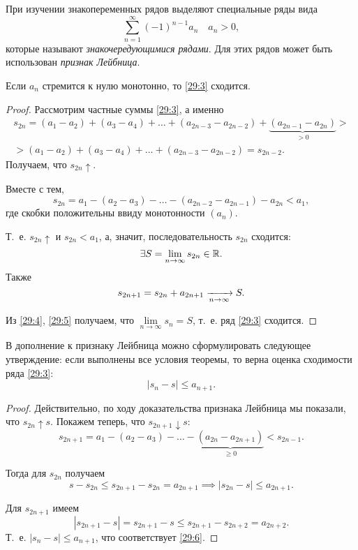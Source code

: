 \documentclass[../../main.tex]{subfiles}
\begin{document}
	При изучении знакопеременных рядов выделяют специальные ряды вида
	\begin{equation}
		\sum_{n = 1}^\infty (-1)^{n - 1}a_n\quad a_n > 0,
		\label{29:3}
	\end{equation}
	которые называют \emph{знакочередующимися рядами}. 
	Для этих рядов может быть использован \emph{признак Лейбница}.
	\begin{thm}
		\label{29:leibnitz}
		Если $a_n$ стремится к нулю монотонно, то \eqref{29:3} сходится.
	\end{thm}
	\begin{proof}
		Рассмотрим частные суммы \eqref{29:3}, а именно
		\begin{gather*}
			s_{2n} = (a_1 - a_2) + (a_3 - a_4) + \ldots + (a_{2n - 3} - a_{2n - 2}) + 
			\underbrace{(a_{2n - 1} - a_{2n})}_{> 0} >\\
			> (a_1 - a_2) + (a_3 - a_4) + \ldots + (a_{2n - 3} - a_{2n - 2}) = s_{2n - 
			2}.
		\end{gather*}
		Получаем, что $s_{2n}\uparrow$.
		
		Вместе с тем,
		\[s_{2n} = a_1 - (a_{2} - a_3) - \ldots - (a_{2n - 2} - a_{2n - 1}) - a_{2n} 
		< a_1,\]
		где скобки положительны ввиду монотонности $(a_n)$.
		
		Т.~е. $s_{2n}\uparrow$ и $s_{2n} < a_1$, а, 
		значит, последовательность $s_{2n}$ сходится:
		\begin{equation}
			\exists S = \lim\limits_{n\to\infty}s_{2n}\in\mathbb{R}.
			\label{29:4}
		\end{equation}
		Также 
		\begin{equation}
			s_{2n + 1} = s_{2n} + a_{2n + 1}
			\xrightarrow[n\to\infty]{} S.
			\label{29:5}
		\end{equation}
		
		Из \eqref{29:4}, \eqref{29:5} получаем, что $\lim\limits_{n\to\infty} s_n = 
		S$, 
		т.~е. ряд 
		\eqref{29:3} сходится.
	\end{proof}

	В дополнение к признаку Лейбница можно 
	сформулировать следующее утверждение: если 
	выполнены все условия теоремы, то верна
	оценка сходимости ряда \eqref{29:3}:
	\begin{equation}
		\left|s_n - s\right|\leq a_{n + 1}.
		\label{29:6}
	\end{equation}
	\begin{proof}
		Действительно, по ходу доказательства признака Лейбница мы показали, что 
		$s_{2n}\uparrow s$. 
		Покажем теперь, что $s_{2n + 1}\downarrow s$:
		\[s_{2n + 1} = a_1 - (a_2 - a_3) - \ldots - \underbrace{(a_{2n} - a_{2n + 
		1})}_{\ge 0} < s_{2n - 
		1}.\]
		
		Тогда для $s_{2n}$ получаем
		\[s - s_{2n} \leq s_{2n + 1} - s_{2n} = a_{2n + 1}
		\implies |s_{2n} - s|\leq a_{2n + 1}.\]
		
		Для $s_{2n + 1}$ имеем
		\[|s_{2n + 1} - s| = s_{2n + 1} - s 
		\leq s_{2n + 1} - s_{2n + 2} = 
		a_{2n + 2}.\]
		Т.~е. $|s_n - s|\leq a_{n + 1}$, что соответствует \eqref{29:6}.
	\end{proof}
\end{document}
